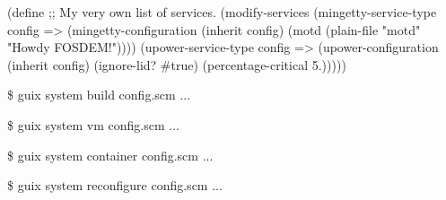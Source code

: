 \documentclass{beamer}
\begin{document}
\begin{frame}[fragile]
  \begin{semiverbatim}
(\alert{define} %
  ;; My very own list of services.
  (\alert{modify-services} %
    (mingetty-service-type config =>
                           (mingetty-configuration
                            (\alert{inherit} config)
                            (motd (plain-file "motd"
                                     "Howdy FOSDEM!"))))
    (upower-service-type config =>
                         (upower-configuration
                          (\alert{inherit} config)
                          (ignore-lid? #true)
                          (percentage-critical 5.)))))
  \end{semiverbatim}
\end{frame}

\begin{frame}[fragile]
  \begin{semiverbatim}
\$ guix system build config.scm
\textrm{...}   

\$ guix system vm config.scm
\textrm{...}

\$ guix system container config.scm
\textrm{...}

\$ guix system reconfigure config.scm
\textrm{...}
  \end{semiverbatim}
\end{frame}
\end{document}
